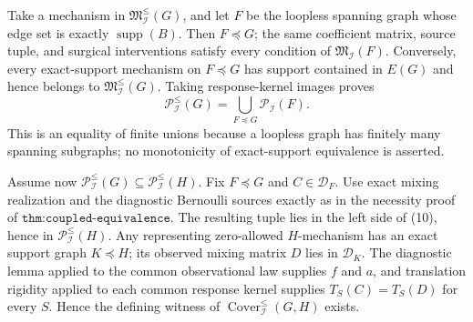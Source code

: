 Take a mechanism in \(\mathfrak M^{\le}_{\mathcal I}(G)\), and let \(F\) be the loopless spanning graph whose edge set is exactly \(\operatorname{supp}(B)\). Then \(F\preceq G\); the same coefficient matrix, source tuple, and surgical interventions satisfy every condition of \(\mathfrak M_{\mathcal I}(F)\). Conversely, every exact-support mechanism on \(F\preceq G\) has support contained in \(E(G)\) and hence belongs to \(\mathfrak M^{\le}_{\mathcal I}(G)\). Taking response-kernel images proves
\[
\mathcal P^{\le}_{\mathcal I}(G)=\bigcup_{F\preceq G}\mathcal P_{\mathcal I}(F). \tag{10}
\]
This is an equality of finite unions because a loopless graph has finitely many spanning subgraphs; no monotonicity of exact-support equivalence is asserted.

Assume now \(\mathcal P^{\le}_{\mathcal I}(G)\subseteq\mathcal P^{\le}_{\mathcal I}(H)\). Fix \(F\preceq G\) and \(C\in\mathcal D_F\). Use exact mixing realization and the diagnostic Bernoulli sources exactly as in the necessity proof of \(\texttt{thm:coupled-equivalence}\). The resulting tuple lies in the left side of (10), hence in \(\mathcal P^{\le}_{\mathcal I}(H)\). Any representing zero-allowed \(H\)-mechanism has an exact support graph \(K\preceq H\); its observed mixing matrix \(D\) lies in \(\mathcal D_K\). The diagnostic lemma applied to the common observational law supplies \(f\) and \(a\), and translation rigidity applied to each common response kernel supplies \(T_S(C)=T_S(D)\) for every \(S\). Hence the defining witness of \(\operatorname{Cover}^{\le}_{\mathcal I}(G,H)\) exists.

